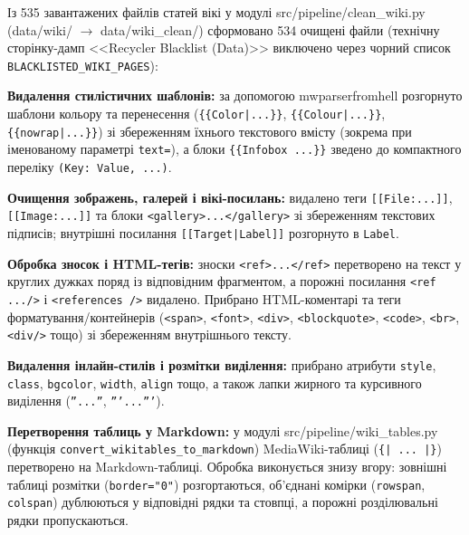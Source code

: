 Із 535 завантажених файлів статей вікі у модулі src/pipeline/clean\_wiki.py (data/wiki/ $\rightarrow$ data/wiki\_clean/) сформовано 534 очищені файли (технічну сторінку-дамп <<Recycler Blacklist (Data)>> виключено через чорний список \texttt{BLACKLISTED\_WIKI\_PAGES}):
\begin{dashlist}[wide]
    \item \textbf{Видалення стилістичних шаблонів:} за допомогою mwparserfromhell розгорнуто шаблони кольору та перенесення (\texttt{\{\{Color|...\}\}}, \texttt{\{\{Colour|...\}\}}, \texttt{\{\{nowrap|...\}\}}) зі збереженням їхнього текстового вмісту (зокрема при іменованому параметрі \texttt{text=}), а блоки \texttt{\{\{Infobox ...\}\}} зведено до компактного переліку \texttt{(Key: Value, ...)}.
    \item \textbf{Очищення зображень, галерей і вікі-посилань:} видалено теги \texttt{[[File:...]]}, \texttt{[[Image:...]]} та блоки \texttt{<gallery>...</gallery>} зі збереженням текстових підписів; внутрішні посилання \texttt{[[Target|Label]]} розгорнуто в \texttt{Label}.
    \item \textbf{Обробка зносок і HTML-тегів:} зноски \texttt{<ref>...</ref>} перетворено на текст у круглих дужках поряд із відповідним фрагментом, а порожні посилання \texttt{<ref .../>} і \texttt{<references />} видалено. Прибрано HTML-коментарі та теги форматування/контейнерів (\texttt{<span>}, \texttt{<font>}, \texttt{<div>}, \texttt{<blockquote>}, \texttt{<code>}, \texttt{<br>}, \texttt{<div/>} тощо) зі збереженням внутрішнього тексту.
    \item \textbf{Видалення інлайн-стилів і розмітки виділення:} прибрано атрибути \texttt{style}, \texttt{class}, \texttt{bgcolor}, \texttt{width}, \texttt{align} тощо, а також лапки жирного та курсивного виділення (\texttt{''...''}, \texttt{'''...'''}).
    \item \textbf{Перетворення таблиць у Markdown:} у модулі src/pipeline/wiki\_tables.py (функція \texttt{convert\_wikitables\_to\_markdown}) MediaWiki-таблиці (\texttt{\{| ... |\}}) перетворено на Markdown-таблиці. Обробка виконується знизу вгору: зовнішні таблиці розмітки (\texttt{border="0"}) розгортаються, об'єднані комірки (\texttt{rowspan}, \texttt{colspan}) дублюються у відповідні рядки та стовпці, а порожні розділювальні рядки пропускаються.
\end{dashlist}

